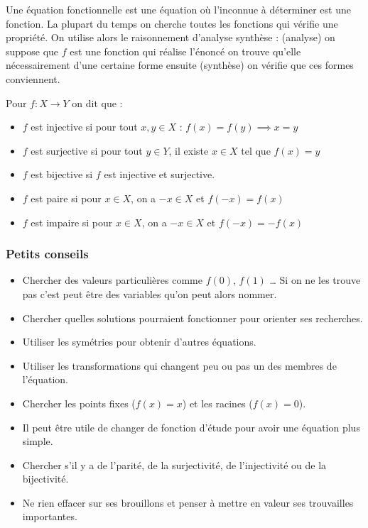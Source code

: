 \begin{rappel}
Une équation fonctionnelle est une équation où l'inconnue à déterminer est une fonction. La plupart du temps on cherche toutes les fonctions qui vérifie une propriété. On utilise alors le raisonnement d'analyse synthèse : (analyse) on suppose que $f$ est une fonction qui réalise l'énoncé on trouve qu'elle nécessairement d'une certaine forme ensuite (synthèse) on vérifie que ces formes conviennent.
\end{rappel}
\begin{rappel}
Pour $f:X\to Y$ on dit que :
\begin{itemize}
    \item $f$ est injective si pour tout $x,y\in X$ : $f(x)=f(y)\implies x=y$
    \item $f$ est surjective si pour tout $y\in Y$, il existe $x\in X$ tel que $f(x)=y$
    \item $f$ est bijective si $f$ est injective et surjective.
    \item $f$ est paire si pour $x\in X$, on a $-x\in X$ et $f(-x)=f(x)$
    \item $f$ est impaire si pour $x\in X$, on a $-x\in X$ et $f(-x)=-f(x)$
\end{itemize}
\end{rappel}
\subsubsection{Petits conseils}
\begin{itemize}
    \item Chercher des valeurs particulières comme $f(0)$, $f(1)$ … Si on ne les trouve pas c'est peut être des variables qu'on peut alors nommer.
    \item Chercher quelles solutions pourraient fonctionner pour orienter ses recherches.
    \item Utiliser les symétries pour obtenir d'autres équations.
    \item Utiliser les transformations qui changent peu ou pas un des membres de l'équation.
    \item Chercher les points fixes ($f(x)=x$) et les racines ($f(x)=0$).
    \item Il peut être utile de changer de fonction d'étude pour avoir une équation plus simple.
    \item Chercher s'il y a de l'parité, de la surjectivité, de l'injectivité ou de la bijectivité.
    \item Ne rien effacer sur ses brouillons et penser à mettre en valeur ses trouvailles importantes.
\end{itemize}

